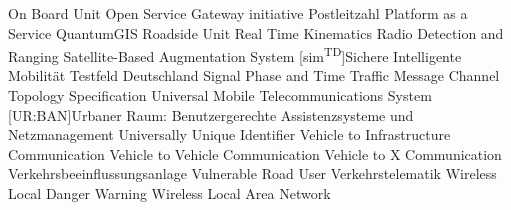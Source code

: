  {On Board Unit}
 {Open Service Gateway initiative}
 {Postleitzahl}
 {Platform as a Service}
 {QuantumGIS}
 {Roadside Unit}
 {Real Time Kinematics}
 {Radio Detection and Ranging}
 {Satellite-Based Augmentation System}
[sim\textsuperscript{TD}]{Sichere Intelligente Mobilität Testfeld Deutschland}
 {Signal Phase and Time}
 {Traffic Message Channel}
 {Topology Specification}
 {Universal Mobile Telecommunications System}
[UR:BAN]{Urbaner Raum: Benutzergerechte Assistenzsysteme und Netzmanagement}
 {Universally Unique Identifier}
 {Vehicle to Infrastructure Communication}
 {Vehicle to Vehicle Communication}
 {Vehicle to X Communication}
 {Verkehrsbeeinflussungsanlage}
 {Vulnerable Road User}
 {Verkehrstelematik}
 {Wireless Local Danger Warning}
 {Wireless Local Area Network}
